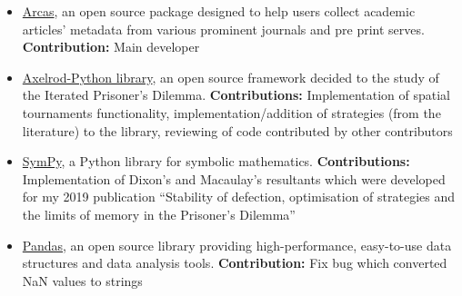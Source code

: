 \begin{itemize}
\item \href{https://github.com/ArcasProject/Arcas}{Arcas}, an open source
package designed to help users collect academic articles' metadata from
various prominent journals and pre print serves.
\textbf{Contribution:} Main developer

\item \href{https://github.com/Axelrod-Python}{Axelrod-Python
library}, an open source framework decided to the study of the
Iterated Prisoner's Dilemma.
\textbf{Contributions:} Implementation of spatial tournaments functionality,
	implementation/addition of strategies (from the literature) to the library,
	reviewing of code contributed by other contributors

\item \href{https://www.sympy.org/en/index.html}{SymPy},
a Python library for symbolic mathematics.
\textbf{Contributions:} Implementation of Dixon's and Macaulay's resultants
which were developed for my 2019 publication ``Stability of defection,
optimisation of strategies and the limits of memory in the Prisoner's Dilemma''

\item\href{https://pandas.pydata.org}{Pandas}, an open source library providing
high-performance, easy-to-use data structures and data analysis tools.
\textbf{Contribution:} Fix bug which converted NaN values to strings
\end{itemize}